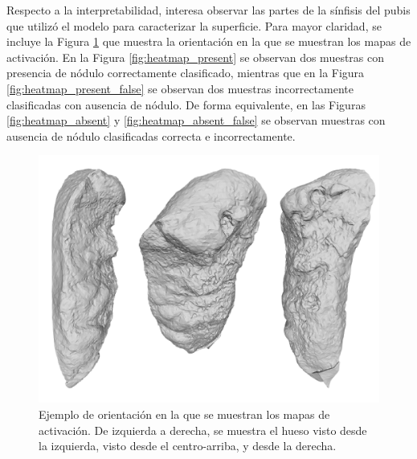 Respecto a la interpretabilidad, interesa observar las partes de la sínfisis del pubis que utilizó el modelo para caracterizar la superficie. Para mayor claridad, se incluye la Figura \ref{fig:heatmap_albedo_117} que muestra la orientación en la que se muestran los mapas de activación. En la Figura \ref{fig:heatmap_present} se observan dos muestras con presencia de nódulo correctamente clasificado, mientras que en la Figura \ref{fig:heatmap_present_false} se observan dos muestras incorrectamente clasificadas con ausencia de nódulo. De forma equivalente, en las Figuras \ref{fig:heatmap_absent} y \ref{fig:heatmap_absent_false} se observan muestras con ausencia de nódulo clasificadas correcta e incorrectamente.

\begin{figure}[h]
    \centering
    \includegraphics[width=\textwidth]{imagenes/experiments/bone117_albedo.png}
    \caption[Orientación, mapas de activación]{Ejemplo de orientación en la que se muestran los mapas de activación. De izquierda a derecha, se muestra el hueso visto desde la izquierda, visto desde el centro-arriba, y desde la derecha.}
    \label{fig:heatmap_albedo_117}
\end{figure}

